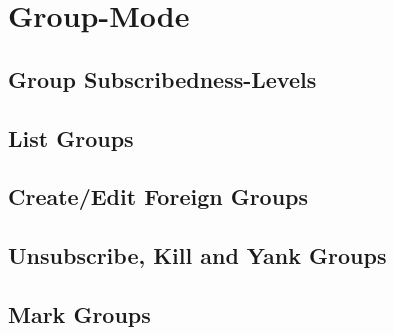 \def\Guide{Booklet}\def\guide{booklet}
\def\logoscale{0.5}
\def\sec{\section}
\def\subsec{\subsection}
\def\subsubsec{\subsubsection}
\def\blankpage{\vspace*{\fill}\par
\par\vspace*{\fill}\pagebreak}



\setcounter{page}{0}
\thispagestyle{empty}
\vspace*{\fill}
\Title
\vspace{0.4in}
\vspace*{\fill}
\pagebreak


\Notes
%
\section*{Group-Mode}
\GroupModeGeneral
    \subsection*{Group Subscribedness-Levels}
    \GroupLevels
    \subsection*{List Groups}
    \ListGroups
    \subsection*{Create/Edit Foreign Groups}
    \CreateEditGroups
    \subsection*{Unsubscribe, Kill and Yank Groups}
    \SubscribeKillYankGroups
    \subsection*{Mark Groups}
    \MarkGroups
